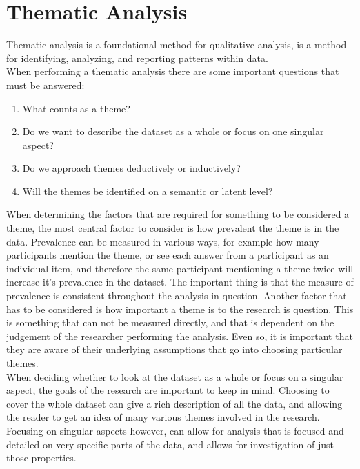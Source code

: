 \documentclass[a4paper,english]{report}
\begin{document}
	\section{Thematic Analysis}
	Thematic analysis is a foundational method for qualitative analysis, is a method for identifying, analyzing, and reporting patterns within data. \cite{braun2006using}\\
	When performing a thematic analysis there are some important questions that must be answered:
	\begin{samepage}\begin{enumerate}
		\item What counts as a theme?
		\item Do we want to describe the dataset as a whole or focus on one singular aspect?
		\item Do we approach themes deductively or inductively?
		\item Will the themes be identified on a semantic or latent level?
	\end{enumerate}\end{samepage}
	When determining the factors that are required for something to be considered a theme, the most central factor to consider is how prevalent the theme is in the data. Prevalence can be measured in various ways, for example how many participants mention the theme, or see each answer from a participant as an individual item, and therefore the same participant mentioning a theme twice will increase it's prevalence in the dataset. The important thing is that the measure of prevalence is consistent throughout the analysis in question. Another factor that has to be considered is how important a theme is to the research is question. This is something that can not be measured directly, and that is dependent on the judgement of the researcher performing the analysis. Even so, it is important that they are aware of their underlying assumptions that go into choosing particular themes.\\
	When deciding whether to look at the dataset as a whole or focus on a singular aspect, the goals of the research are important to keep in mind. Choosing to cover the whole dataset can give a rich description of all the data, and allowing the reader to get an idea of many various themes involved in the research. Focusing on singular aspects however, can allow for analysis that is focused and detailed on very specific parts of the data, and allows for investigation of just those properties.\\
\end{document}
